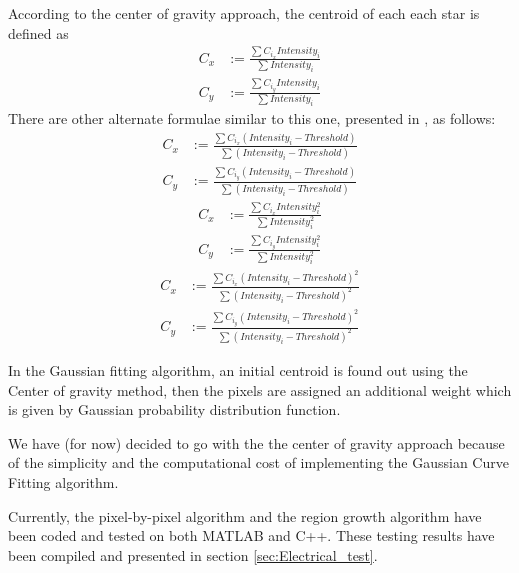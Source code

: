 \documentclass[../../main.tex]{subfiles}
\begin{document}
According to the center of gravity approach, the centroid of each each star is defined as
\begin{equation}
\boxed{
\begin{aligned}
    C_{x} & := \frac{\sum C_{i_{x}}Intensity_{i}}{\sum Intensity_{i}}\\
    C_{y} & := \frac{\sum C_{i_{y}}Intensity_{i}}{\sum Intensity_{i}}
\end{aligned}
}
\end{equation}
There are other alternate formulae similar to this one, presented in \cite{zhang2011star}, as follows:
\begin{equation}
\boxed{
\begin{aligned}
    C_{x} & := \frac{\sum C_{i_{x}}(Intensity_{i}-Threshold)}{\sum (Intensity_{i}-Threshold)}\\
    C_{y} & := \frac{\sum C_{i_{y}}(Intensity_{i}-Threshold)}{\sum (Intensity_{i}-Threshold)}
\end{aligned}
}
\end{equation}
\begin{equation}
\boxed{
\begin{aligned}
    C_{x} & := \frac{\sum C_{i_{x}}Intensity^2_{i}}{\sum Intensity^2_{i}}\\
    C_{y} & := \frac{\sum C_{i_{y}}Intensity^2_{i}}{\sum Intensity^2_{i}}
\end{aligned}
}
\end{equation}
\begin{equation}
\boxed{
\begin{aligned}
    C_{x} & := \frac{\sum C_{i_{x}}(Intensity_{i}-Threshold)^2}{\sum (Intensity_{i}-Threshold)^2}\\
    C_{y} & := \frac{\sum C_{i_{y}}(Intensity_{i}-Threshold)^2}{\sum (Intensity_{i}-Threshold)^2}
\end{aligned}
}
\end{equation}


In the Gaussian fitting algorithm, an initial centroid is found out using the Center of gravity method, then the pixels are assigned an additional weight which is given by Gaussian probability distribution function.

We have (for now) decided to go with the the center of gravity approach because of the simplicity and the computational cost of implementing the Gaussian Curve Fitting algorithm.

Currently, the pixel-by-pixel algorithm and the region growth algorithm have been coded and tested on both MATLAB and C++. These testing results have been compiled and presented in section \ref{sec:Electrical_test}.
\end{document}
